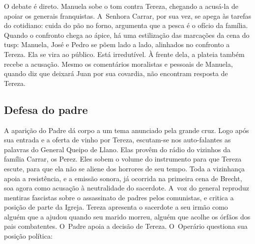 {

O debate é direto. Manuela sobe o tom contra Tereza, chegando a acusá-la
de apoiar os generais franquistas. A~Senhora Carrar, por sua vez, se
apega às tarefas do cotidiano: cuida do pão no forno, argumenta que a
pesca é o ofício da família. Quando o confronto chega ao ápice, há uma
estilização das marcações da cena do {\sc tusp}: Manuela, José e Pedro se põem
lado a lado, alinhados no confronto a Tereza. Ela se vira ao público.
Está irredutível. À frente dela, a plateia também recebe a acusação.
Mesmo os comentários moralistas e pessoais de Manuela, quando diz que
deixará Juan por sua covardia, não encontram resposta de Tereza.



\subsection{Defesa do padre}

A aparição do Padre dá corpo a um tema anunciado pela grande cruz. Logo
após sua entrada e a oferta de vinho por Tereza, escutam-se nos
auto-falantes as palavras do General Queipo de Llano. Elas provêm do
rádio do vizinhos da família Carrar, os Perez. Eles sobem o volume do
instrumento para que Tereza escute, para que ela não se aliene dos
horrores de seu tempo. Toda a vizinhança apoia a resistência, e a emissão
sonora, já ocorrida na primeira cena de Brecht, soa agora como
acusação à neutralidade do sacerdote. A~voz do general reproduz mentiras
fascistas sobre o assassinato de padres pelos comunistas, e critica a
posição de parte da Igreja. Tereza apresenta o sacerdote a
seu irmão como alguém que a ajudou quando seu marido morreu, alguém que
acolhe os órfãos dos pais combatentes. O~Padre apoia a decisão de
Tereza. O~Operário questiona sua posição política:

}
